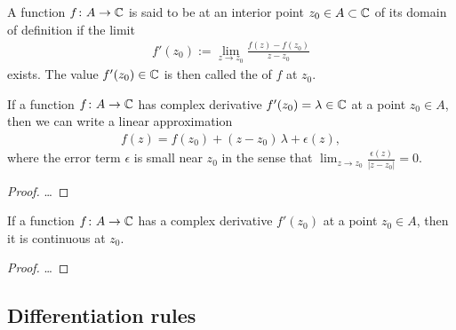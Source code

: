 \begin{definition}
  \label{def:complex_derivative}
  A function $f \colon A \to \mathbb{C}$ is said to be
   at an interior
  point $z_0 \in A \subset \mathbb{C}$ of its domain of definition
  if the limit
  \begin{align*}
    f'(z_0) := \lim_{z \to z_0} \frac{f(z) - f(z_0)}{z - z_0}
  \end{align*}
  exists. The value $f'(z_0) \in \mathbb{C}$ is then called the
   of $f$ at $z_0$.
\end{definition}

\begin{lemma}
  \label{lem:local_linear_approximation}
  If a function $f \colon A \to \mathbb{C}$ has complex derivative
  $f'(z_0) = \lambda \in \mathbb{C}$ at a point $z_0 \in A$, then
  we can write a linear approximation
  \begin{align*}
    f(z) = f(z_0) + (z - z_0) \, \lambda + \epsilon(z) ,
  \end{align*}
  where the error term $\epsilon$ is small near $z_0$ in the sense that
  $\lim_{z \to z_0} \frac{\epsilon(z)}{|z-z_0|} = 0$.
\end{lemma}
\begin{proof}
  \ldots
\end{proof}

\begin{lemma}
  \label{lem:complex_differentiable_implies_continuous}
  If a function $f \colon A \to \mathbb{C}$ has a complex derivative $f'(z_0)$
  at a point $z_0 \in A$, then it is continuous at $z_0$.
\end{lemma}
\begin{proof}
  \ldots
\end{proof}


\subsection{Differentiation rules}

